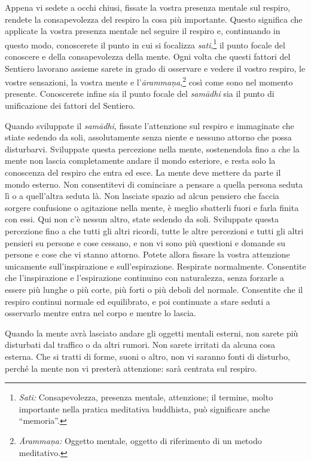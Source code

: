 Appena vi sedete a occhi chiusi, fissate la vostra presenza mentale sul
respiro, rendete la consapevolezza del respiro la cosa più importante.
Questo significa che applicate la vostra presenza mentale nel seguire il
respiro e, continuando in questo modo, conoscerete il punto in cui si
focalizza \emph{sati},\footnote{\emph{Sati:} Consapevolezza, presenza
  mentale, attenzione; il termine, molto importante nella pratica
  meditativa buddhista, può significare anche ``memoria''.} il punto
focale del conoscere e della consapevolezza della mente. Ogni volta che
questi fattori del Sentiero lavorano assieme sarete in grado di
osservare e vedere il vostro respiro, le vostre sensazioni, la vostra
mente e l'\emph{ārammaṇa},\footnote{\emph{Ārammaṇa:} Oggetto mentale,
  oggetto di riferimento di un metodo meditativo.} così come sono nel
momento presente. Conoscerete infine sia il punto focale del
\emph{samādhi} sia il punto di unificazione dei fattori del Sentiero.

Quando sviluppate il \emph{samādhi}, fissate l'attenzione sul respiro e
immaginate che stiate sedendo da soli, assolutamente senza niente e
nessuno attorno che possa disturbarvi. Sviluppate questa percezione
nella mente, sostenendola fino a che la mente non lascia completamente
andare il mondo esteriore, e resta solo la conoscenza del respiro che
entra ed esce. La mente deve mettere da parte il mondo esterno. Non
consentitevi di cominciare a pensare a quella persona seduta lì o a
quell'altra seduta là. Non lasciate spazio ad alcun pensiero che faccia
sorgere confusione o agitazione nella mente, è meglio sbatterli fuori e
farla finita con essi. Qui non c'è nessun altro, state sedendo da soli.
Sviluppate questa percezione fino a che tutti gli altri ricordi, tutte
le altre percezioni e tutti gli altri pensieri su persone e cose
cessano, e non vi sono più questioni e domande su persone e cose che vi
stanno attorno. Potete allora fissare la vostra attenzione unicamente
sull'inspirazione e sull'espirazione. Respirate normalmente. Consentite
che l'inspirazione e l'espirazione continuino con naturalezza, senza
forzarle a essere più lunghe o più corte, più forti o più deboli del
normale. Consentite che il respiro continui normale ed equilibrato, e
poi continuate a stare seduti a osservarlo mentre entra nel corpo e
mentre lo lascia.

Quando la mente avrà lasciato andare gli oggetti mentali esterni, non
sarete più disturbati dal traffico o da altri rumori. Non sarete
irritati da alcuna cosa esterna. Che si tratti di forme, suoni o altro,
non vi saranno fonti di disturbo, perché la mente non vi presterà
attenzione: sarà centrata sul respiro.

